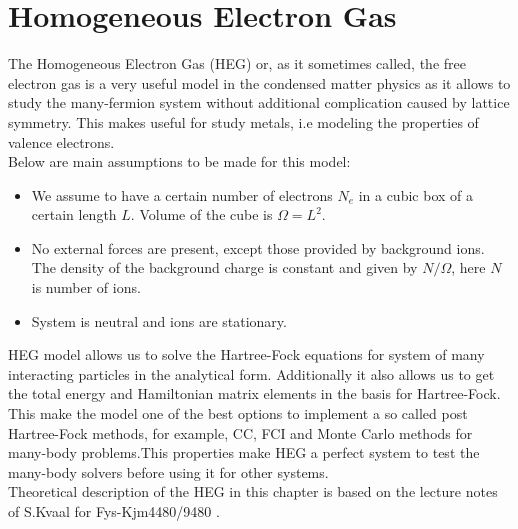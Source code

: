 \documentclass[twoside,english]{uiofysmaster}
\theoremstyle{definition}
\begin{document}
\chapter{Homogeneous Electron Gas}
The Homogeneous Electron Gas (HEG) or, as it sometimes called, the free electron gas is a very useful model in the condensed matter physics as it allows to study the many-fermion system without additional complication caused by lattice symmetry.  This makes useful for study metals, i.e modeling the properties of valence electrons.\\
Below are main assumptions to be made for this model:
\begin{itemize}
	\item We assume to have a certain number of electrons $N_e$ in a cubic box of a certain length $L$. Volume of the cube is $\Omega= L^2$.
	\item No external forces are present, except those provided by background ions. The density of the background charge is constant and given by $N/\Omega$, here $N$ is number of ions.
	\item System is neutral and ions are stationary.
\end{itemize}

HEG model allows us to solve the Hartree-Fock equations for system of many interacting particles in the analytical form. Additionally it also allows us to get the total energy and Hamiltonian matrix elements in the basis for Hartree-Fock. This make the model one of the best options to implement a so called post Hartree-Fock methods, for example, CC, FCI  and  Monte Carlo methods for many-body problems.This properties make HEG a perfect system to test the many-body solvers before using it for other systems.\\
Theoretical description of the HEG in this chapter is based on the lecture notes of S.Kvaal for Fys-Kjm4480/9480 \cite{s.kvaal.LectureNotesFysKjm44802015}.
\end{document}
